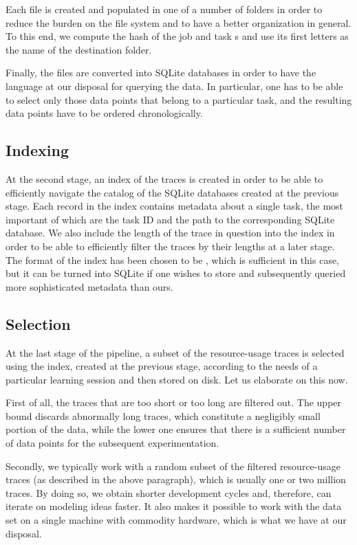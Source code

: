 Each  file is created and populated in one of a number of folders in
order to reduce the burden on the file system and to have a better organization
in general. To this end, we compute the  hash of the job and task
s and use its first letters as the name of the destination folder.

Finally, the  files are converted into SQLite databases in order to have
the  language at our disposal for querying the data. In particular, one
has to be able to select only those data points that belong to a particular
task, and the resulting data points have to be ordered chronologically.

\subsection{Indexing} 
At the second stage, an index of the traces is created in order to be able to
efficiently navigate the catalog of the SQLite databases created at the previous
stage. Each record in the index contains metadata about a single task, the most
important of which are the task ID and the path to the corresponding SQLite
database. We also include the length of the trace in question into the index in
order to be able to efficiently filter the traces by their lengths at a later
stage. The format of the index has been chosen to be , which is
sufficient in this case, but it can be turned into SQLite if one wishes to store
and subsequently queried more sophisticated metadata than ours.

\subsection{Selection} 
At the last stage of the pipeline, a subset of the resource-usage traces is
selected using the index, created at the previous stage, according to the needs
of a particular learning session and then stored on disk. Let us elaborate on
this now.

First of all, the traces that are too short or too long are filtered out. The
upper bound discards abnormally long traces, which constitute a negligibly small
portion of the data, while the lower one ensures that there is a sufficient
number of data points for the subsequent experimentation.

Secondly, we typically work with a random subset of the filtered resource-usage
traces (as described in the above paragraph), which is usually one or two
million traces. By doing so, we obtain shorter development cycles and,
therefore, can iterate on modeling ideas faster. It also makes it possible to
work with the data set on a single machine with commodity hardware, which is
what we have at our disposal.

